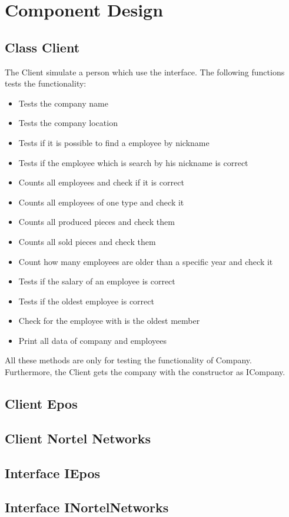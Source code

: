 	
\section{Component Design}
\subsection{Class Client}
The Client simulate a person which use the interface.
The following functions tests the functionality:
\begin{itemize}
	\item Tests the company name
	\item Tests the company location
	\item Tests if it is possible to find a employee by nickname
	\item Tests if the employee which is search by his nickname is correct
	\item Counts all employees and check if it is correct
	\item Counts all employees of one type and check it
	\item Counts all produced pieces and check them
	\item Counts all sold pieces and check them
	\item Count how many employees are older than a specific year and check it
	\item Tests if the salary of an employee is correct
	\item Tests if the oldest employee is correct
	\item Check for the employee with is the oldest member
	\item Print all data of company and employees
\end{itemize}

All these methods are only for testing the functionality of Company. Furthermore, the Client gets the company with the constructor as ICompany.

\subsection{Client Epos}
\subsection{Client Nortel Networks}
\subsection{Interface IEpos}
\subsection{Interface INortelNetworks}
